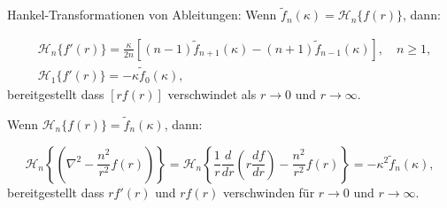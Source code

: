 \begin{satz}{Hankel-Transformationen von Ableitungen:}
Wenn $\tilde{f}_n(\kappa)=\mathscr{H}_n\{f(r)\}$, dann:

\begin{align*}
	&\mathscr{H}_n\{f'(r)\}=\frac{\kappa}{2n}\left[(n-1)\tilde{f}_{n+1}(\kappa)-(n+1)\tilde{f}_{n-1}(\kappa)\right], \quad n\geq1, \\
	&\mathscr{H}_1\{f'(r)\}=-\kappa \tilde{f}_0(\kappa),
\end{align*}
bereitgestellt dass $[rf(r)]$ verschwindet als $r\to0$ und $r\to\infty$.
\end{satz}

\begin{satz}
Wenn $\mathscr{H}_n\{f(r)\}=\tilde{f}_n(\kappa)$, dann:

\begin{equation*}
	\mathscr{H}_n \left\{ \left( \nabla^2 - \frac{n^2}{r^2} f(r)\right)\right\}= \mathscr{H}_n\left\{\frac{1}{r}\frac{d}{dr}\left(r\frac{df}{dr}\right) - \frac{n^2}{r^2}f(r)\right\}=-\kappa^2\tilde{f}_{n}(\kappa),
\end{equation*}
bereitgestellt dass $rf'(r)$ und $rf(r)$ verschwinden für $r\to0$ und $r\to\infty$.
\end{satz}
